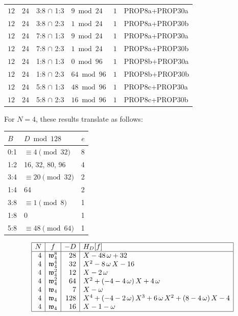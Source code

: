 \documentclass[12pt,twoside,leqno]{article}
\numberwithin{equation}{section}
\newcommand{\w}{\mathfrak w}
\begin{document}
\begin{center}
\begin{tabular}{|r|r||l|l||r||l|}
$12$ & $24$ & 3:8 $\cap$ 1:3 & $9\bmod 24$ & $1$ & PROP8a+PROP30a\\
$12$ & $24$ & 3:8 $\cap$ 2:3 & $1\bmod 24$ & $1$ & PROP8a+PROP30b\\
$12$ & $24$ & 7:8 $\cap$ 1:3 & $9\bmod 24$ & $1$ & PROP8a+PROP30a\\
$12$ & $24$ & 7:8 $\cap$ 2:3 & $1\bmod 24$ & $1$ & PROP8a+PROP30b\\
$12$ & $24$ & 1:8 $\cap$ 1:3 & $0\bmod 96$ & $1$ & PROP8b+PROP30a\\
$12$ & $24$ & 1:8 $\cap$ 2:3 & $64\bmod 96$ & $1$ & PROP8b+PROP30b\\
$12$ & $24$ & 5:8 $\cap$ 1:3 & $48\bmod 96$ & $1$ & PROP8c+PROP30a\\
$12$ & $24$ & 5:8 $\cap$ 2:3 & $16\bmod 96$ & $1$ & PROP8c+PROP30b\\
\hline
\end{tabular}
\end{center}

For $N=4$, these results translate as follows:

\begin{center}
\begin{tabular}{|l|l|r|}\hline
$B$ & $D\bmod 128$ & $e$ \\\hline
0:1& $\equiv 4 \pmod {32}$ & 8 \\
1:2& 16, 32, 80, 96 & 4 \\
3:4& $\equiv 20 \pmod {32}$ & 2 \\
1:4& 64 & 2 \\
3:8& $\equiv 1 \pmod 8$  & 1 \\
1:8& 0 & 1 \\
5:8& $\equiv 48 \pmod {64}$ & 1 \\
\hline
\end{tabular}
\end{center}

$$\begin{array}{|r|c|r|l|}\hline
N & f & -D & H_{D}[f] \\ \hline
4 & \w_{4}^{8} & 28 &
X-48\,\omega+32
\\
4 & \w_{4}^{4} & 32 &
{X}^{2}-8\,\omega\,X-16
\\
4 & \w_{4}^{2} & 12 &
X-2\,\omega
\\
4 & \w_{4}^{2} & 64 &
{X}^{2}+ \left( -4-4\,\omega \right) X+4\,\omega
\\
4 & \w_{4} & 7 &
X-\omega
\\
4 & \w_{4} & 128 &
{X}^{4}+ \left( -4-2\,\omega \right) {X}^{3}+6\,\omega\,{X}^{2}+
 \left( 8-4\,\omega \right) X-4
\\
4 & \w_{4} & 16 &
X-1-\omega
\\
\hline
\end{array}$$
\end{document}
